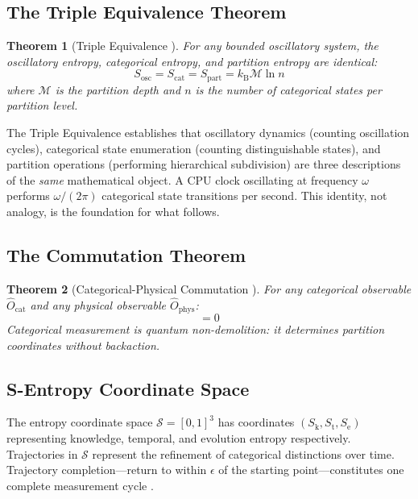 \documentclass[11pt,twocolumn,a4paper]{article}
\newtheorem{theorem}{Theorem}[section]
\theoremstyle{definition}
\theoremstyle{remark}
\newcommand{\kB}{k_{\mathrm{B}}}
\newcommand{\Sk}{S_{\mathrm{k}}}
\newcommand{\St}{S_{\mathrm{t}}}
\newcommand{\Se}{S_{\mathrm{e}}}
\newcommand{\Sspace}{\mathcal{S}}
\newcommand{\Depth}{\mathcal{M}}
\begin{document}
\subsection{The Triple Equivalence Theorem}

\begin{theorem}[Triple Equivalence {\citep[Theorem~5.1]{sachikonye2025a}}]
\label{thm:triple_recap}
For any bounded oscillatory system, the oscillatory entropy, categorical entropy, and partition entropy are identical:
\begin{equation}
S_{\mathrm{osc}} = S_{\mathrm{cat}} = S_{\mathrm{part}} = \kB \Depth \ln n
\label{eq:triple_equivalence}
\end{equation}
where $\Depth$ is the partition depth and $n$ is the number of categorical states per partition level.
\end{theorem}

The Triple Equivalence establishes that oscillatory dynamics (counting oscillation cycles), categorical state enumeration (counting distinguishable states), and partition operations (performing hierarchical subdivision) are three descriptions of the \emph{same} mathematical object. A CPU clock oscillating at frequency $\omega$ performs $\omega/(2\pi)$ categorical state transitions per second. This identity, not analogy, is the foundation for what follows.

\subsection{The Commutation Theorem}

\begin{theorem}[Categorical-Physical Commutation {\citep[Theorem~8.1]{sachikonye2025a}}]
\label{thm:commutation_recap}
For any categorical observable $\hat{O}_{\mathrm{cat}}$ and any physical observable $\hat{O}_{\mathrm{phys}}$:
\begin{equation}
[\hat{O}_{\mathrm{cat}}, \hat{O}_{\mathrm{phys}}] = 0
\label{eq:commutation}
\end{equation}
Categorical measurement is quantum non-demolition: it determines partition coordinates without backaction.
\end{theorem}

\subsection{S-Entropy Coordinate Space}

The entropy coordinate space $\Sspace = [0,1]^3$ has coordinates $(\Sk, \St, \Se)$ representing knowledge, temporal, and evolution entropy respectively. Trajectories in $\Sspace$ represent the refinement of categorical distinctions over time. Trajectory completion---return to within $\epsilon$ of the starting point---constitutes one complete measurement cycle \citep{sachikonye2025a}.
\end{document}
